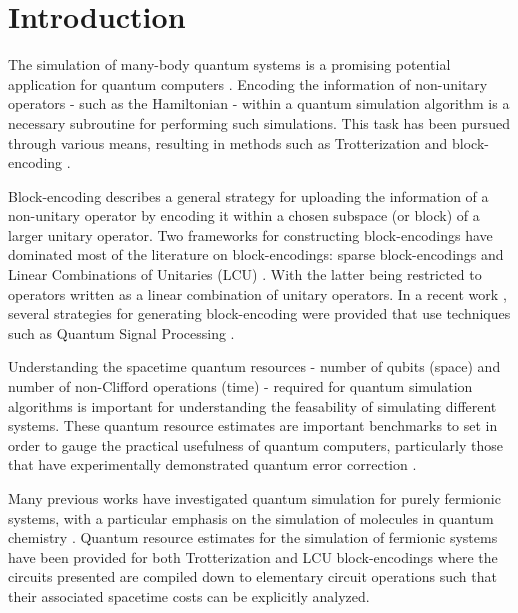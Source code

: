 \section{Introduction}
\label{sec:intro}

The simulation of many-body quantum systems is a promising potential application for quantum computers \cite{feynman2018simulating}.
Encoding the information of non-unitary operators - such as the Hamiltonian - within a quantum simulation algorithm is a necessary subroutine for performing such simulations.
This task has been pursued through various means, resulting in methods such as Trotterization \cite{suzuki1976generalized,hatano2005finding,lie1893theorie,trotter1959product,childs2021theory} and block-encoding \cite{lin2022lecture, poulin2018quantum, low2019hamiltonian}.

Block-encoding describes a general strategy for uploading the information of a non-unitary operator by encoding it within a chosen subspace (or block) of a larger unitary operator.
Two frameworks for constructing block-encodings have dominated most of the literature on block-encodings: sparse block-encodings \cite{berry2009black, childs2009universal, lin2022lecture} and Linear Combinations of Unitaries (LCU) \cite{childs2012hamiltonian}.
With the latter being restricted to operators written as a linear combination of unitary operators.
In a recent work \cite{kane2024block}, several strategies for generating block-encoding were provided that use techniques such as Quantum Signal Processing \cite{low2017optimal}.

Understanding the spacetime quantum resources - number of qubits (space) and number of non-Clifford operations (time) - required for quantum simulation algorithms is important for understanding the feasability of simulating different systems.
These quantum resource estimates are important benchmarks to set in order to gauge the practical usefulness of quantum computers, particularly those that have experimentally demonstrated quantum error correction \cite{bluvstein2024logical, acharya2024quantum}.

Many previous works have investigated quantum simulation for purely fermionic systems, with a particular emphasis on the simulation of molecules in quantum chemistry \cite{aspuru2005simulated, peruzzo2014variational, babbush2014adiabatic, o2016scalable, babbush2018encoding, google2020hartree, lee2021even}.
Quantum resource estimates for the simulation of fermionic systems have been provided for both Trotterization \cite{kivlichan2020improved, campbell2021early} and LCU block-encodings \cite{babbush2018encoding,lee2021even} where the circuits presented are compiled down to elementary circuit operations such that their associated spacetime costs can be explicitly analyzed.

